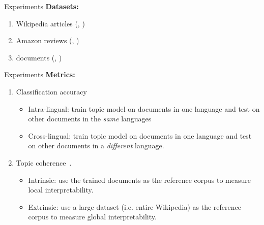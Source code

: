 \begin{frame}{Experiments}
\textbf{Datasets: }
    \begin{enumerate}
        \item Wikipedia articles (, )
        \item Amazon reviews (, ) 
        \item {} documents (, )
    \end{enumerate} 
\end{frame}

\begin{frame}{Experiments}
\textbf{Metrics: }
    \begin{enumerate}
        \item Classification accuracy
        \begin{itemize}
            \item Intra-lingual: train topic model on documents in one language and test on other documents in the \emph{same} languages
            \item Cross-lingual: train topic model on documents in one language and test on other documents in a \emph{different} language.
        \end{itemize}
        \item Topic coherence~\cite{lau-2014}.
        \begin{itemize}
            \item Intrinsic: use the trained documents as the reference corpus to measure local interpretability.
            \item Extrinsic: use a large dataset (i.e. entire Wikipedia) as the reference corpus to measure global interpretability. 
        \end{itemize}
    \end{enumerate}
\end{frame}

